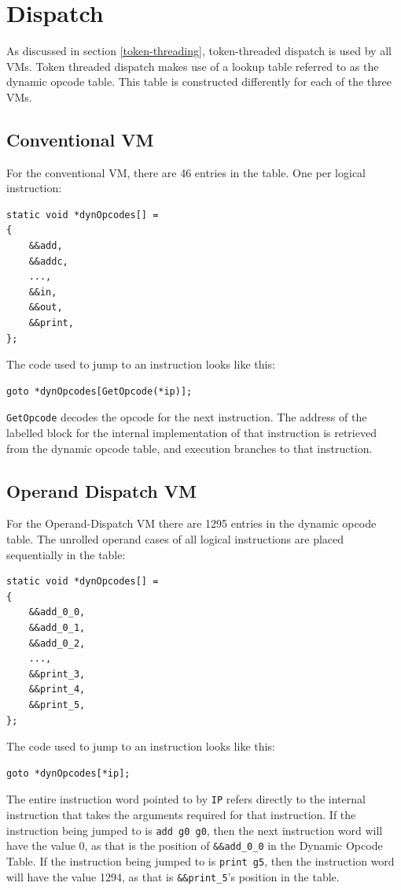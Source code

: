 \documentclass[english,a4paper,12pt]{report}
\begin{document}
\newpage
\section{Dispatch}
\label{sec:labels-as-addresses}
As discussed in section \ref{token-threading}, token-threaded dispatch
is used by all VMs. Token threaded dispatch makes use of a lookup
table referred to as the dynamic opcode table. This table is
constructed differently for each of the three VMs.

\subsection{Conventional VM}
\label{sec:conv-vm-dispatch}

For the conventional VM, there are 46 entries in the table. One per
logical instruction:
\begin{lstlisting}
static void *dynOpcodes[] = 
{
    &&add,
    &&addc,
    ...,
    &&in,
    &&out,
    &&print,
};
\end{lstlisting}

The code used to jump to an instruction looks like this:
\begin{lstlisting}
goto *dynOpcodes[GetOpcode(*ip)];
\end{lstlisting}
\verb|GetOpcode| decodes the opcode for the next instruction. The
address of the labelled block for the internal implementation of that
instruction is retrieved from the dynamic opcode table, and execution
branches to that instruction.


\subsection{Operand Dispatch VM}
\label{sec:operand-dispatch-dispatch}
For the Operand-Dispatch VM there are 1295 entries in the dynamic
opcode table. The unrolled operand cases of all logical instructions are
placed sequentially in the table:
\begin{lstlisting}
static void *dynOpcodes[] = 
{
    &&add_0_0,
    &&add_0_1,
    &&add_0_2,
    ...,
    &&print_3,
    &&print_4,
    &&print_5,	
};	
\end{lstlisting}

The code used to jump to an instruction looks like this:
\begin{lstlisting}
goto *dynOpcodes[*ip];
\end{lstlisting}

The entire instruction word pointed to by \verb|IP| refers directly to
the internal instruction that takes the arguments required for that
instruction. If the instruction being jumped to is \verb|add g0 g0|,
then the next instruction word will have the value 0, as that is the
position of \verb|&&add_0_0| in the Dynamic Opcode Table. If the
instruction being jumped to is \verb|print g5|, then the instruction
word will have the value 1294, as that is \verb|&&print_5|'s position
in the table.
\end{document}
